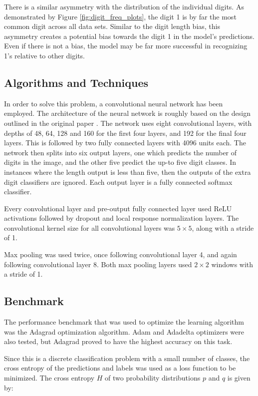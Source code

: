 \documentclass[12pt]{article}
\begin{document}
There is a similar asymmetry with the distribution of the individual digits.
As demonstrated by Figure \ref{fig:digit_freq_plots}, the digit 1 is by far the most common digit across all data sets.
Similar to the digit length bias, this asymmetry creates a potential bias towards the digit 1 in the model's predictions.
Even if there is not a bias, the model may be far more successful in recognizing 1's relative to other digits.

\subsection{Algorithms and Techniques}
In order to solve this problem, a convolutional neural network has been employed.
The architecture of the neural network is roughly based on the design outlined in the original paper \cite{svhn_original_paper}.
The network uses eight convolutional layers, with depths of 48, 64, 128 and 160 for the first four layers, and 192 for the final four layers.
This is followed by two fully connected layers with 4096 units each.
The network then splits into six output layers, one which predicts the number of digits in the image, and the other five predict the up-to five digit classes.
In instances where the length output is less than five, then the outputs of the extra digit classifiers are ignored.
Each output layer is a fully connected softmax classifier.

Every convolutional layer and pre-output fully connected layer used ReLU\cite{relu} activations followed by dropout\cite{svhn_dropout} and local response normalization\cite{svhn_lrn} layers.
The convolutional kernel size for all convolutional layers was $5 \times 5$, along with a stride of 1.

Max pooling was used twice, once following convolutional layer 4, and again following convolutional layer 8.
Both max pooling layers used $2 \times 2$ windows with a stride of 1.

\subsection{Benchmark}
The performance benchmark that was used to optimize the learning algorithm was the Adagrad optimization algorithm. 
Adam and Adadelta optimizers were also tested, but Adagrad proved to have the highest accuracy on this task.

Since this is a discrete classification problem with a small number of classes, the cross entropy of the predictions and labels was used as a loss function to be minimized.
The cross entropy $H$ of two probability distributions $p$ and $q$ is given by:
\end{document}
